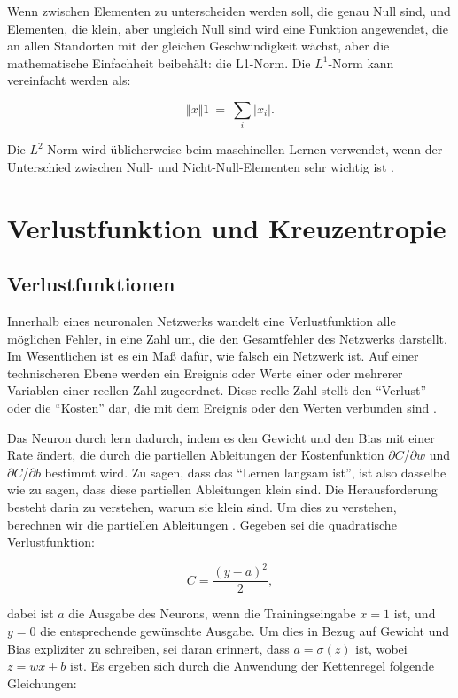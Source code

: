    Wenn zwischen Elementen zu unterscheiden werden soll, die genau Null sind, und Elementen, die klein, aber ungleich Null sind wird eine Funktion angewendet, die an allen Standorten mit der gleichen Geschwindigkeit wächst, aber die mathematische Einfachheit beibehält: die L1-Norm. Die $L^1$-Norm kann vereinfacht werden als:

    \begin{equation} \label{FormelNorm1}
      \Vert x\Vert 1\ =\ \sum _{i}\bigr| x_{i}\bigr|.
    \end{equation}

    Die $L^2$-Norm wird üblicherweise beim maschinellen Lernen verwendet, wenn der Unterschied zwischen Null- und Nicht-Null-Elementen sehr wichtig ist \cite*[40]{IanGoodfellowYoshuaBengio2016}.


    \section{Verlustfunktion und Kreuzentropie}
    \subsection{Verlustfunktionen}
    Innerhalb eines neuronalen Netzwerks wandelt eine Verlustfunktion alle möglichen Fehler, in eine Zahl um, die den Gesamtfehler des Netzwerks darstellt. Im Wesentlichen ist es ein Maß dafür, wie falsch ein Netzwerk ist. Auf einer technischeren Ebene werden ein Ereignis oder Werte einer oder mehrerer Variablen einer reellen Zahl zugeordnet. Diese reelle Zahl stellt  den \enquote{Verlust} oder die \enquote{Kosten} dar, die mit dem Ereignis oder den Werten verbunden sind \cite*[61-62]{Taylor2017}.

    Das Neuron durch lern dadurch, indem es den Gewicht und den Bias mit einer Rate ändert, die durch die partiellen Ableitungen der Kostenfunktion $\partial$$C$/$\partial$$w$ und $\partial$$C$/$\partial$$b$ bestimmt wird. Zu sagen, dass  das \enquote{Lernen langsam ist}, ist also dasselbe wie zu sagen, dass diese partiellen Ableitungen klein sind. Die Herausforderung besteht darin zu verstehen, warum sie klein sind. Um dies zu verstehen, berechnen wir die partiellen Ableitungen \cite*[61]{Nielsen2015}. Gegeben sei die quadratische Verlustfunktion:

    \begin{equation} \label{Formel2_5}
      C=\frac{( y-a)^{2}}{2},
    \end{equation}

    dabei ist $a$ die Ausgabe des Neurons, wenn die Trainingseingabe $x = 1$ ist, und $y = 0$ die entsprechende gewünschte Ausgabe. Um dies in Bezug auf Gewicht und Bias expliziter zu schreiben, sei daran erinnert, dass $a = \sigma(z)$ ist, wobei $z = wx + b$ ist. Es ergeben sich durch die Anwendung der Kettenregel folgende Gleichungen:

